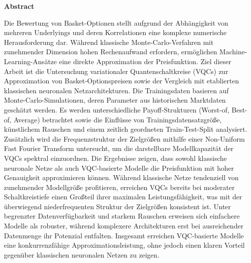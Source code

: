 %
%
\vspace*{2cm}

\begin{center}
    \textbf{Abstract}
\end{center}

\vspace*{1cm}

\noindent Die Bewertung von Basket-Optionen stellt aufgrund der Abhängigkeit von mehreren Underlyings und deren Korrelationen eine komplexe numerische Herausforderung dar. Während klassische Monte-Carlo-Verfahren mit zunehmender Dimension hohen Rechenaufwand erfordern, ermöglichen Machine-Learning-Ansätze eine direkte Approximation der Preisfunktion. Ziel dieser Arbeit ist die Untersuchung variationaler Quantenschaltkreise (VQCs) zur Approximation von Basket-Optionspreisen sowie der Vergleich mit etablierten klassischen neuronalen Netzarchitekturen. Die Trainingsdaten basieren auf Monte-Carlo-Simulationen, deren Parameter aus historischen Marktdaten geschätzt werden. Es werden unterschiedliche Payoff-Strukturen (Worst-of, Best-of, Average) betrachtet sowie die Einflüsse von Trainingsdatensatzgröße, künstlichem Rauschen und einem zeitlich geordneten Train-Test-Split analysiert. Zusätzlich wird die Frequenzstruktur der Zielgrößen mithilfe einer Non-Uniform Fast Fourier Transform untersucht, um die darstellbare Modellkapazität der VQCs spektral einzuordnen. Die Ergebnisse zeigen, dass sowohl klassische neuronale Netze als auch VQC-basierte Modelle die Preisfunktion mit hoher Genauigkeit approximieren können. Während klassische Netze tendenziell von zunehmender Modellgröße profitieren, erreichen VQCs bereits bei moderater Schaltkreistiefe einen Großteil ihrer maximalen Leistungsfähigkeit, was mit der überwiegend niederfrequenten Struktur der Zielgrößen konsistent ist. Unter begrenzter Datenverfügbarkeit und starkem Rauschen erweisen sich einfachere Modelle als robuster, während komplexere Architekturen erst bei ausreichender Datenmenge ihr Potenzial entfalten. Insgesamt erreichen VQC-basierte Modelle eine konkurrenzfähige Approximationsleistung, ohne jedoch einen klaren Vorteil gegenüber klassischen neuronalen Netzen zu zeigen.